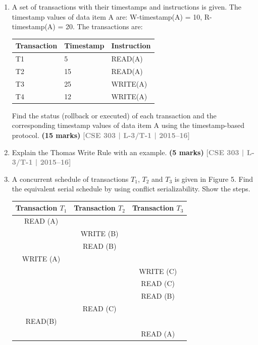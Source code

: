 \documentclass[12pt,a3paper]{article}
\newcommand{\yr}[1]{\hfill\textcolor{gray}{\small\textbf{[#1]}}}
\newcommand{\mk}[1]{\textcolor{orange!70!black}{\small\textbf{(#1 marks)}}}
\begin{document}
\begin{enumerate}
\item A set of transactions with their timestamps and instructions is given. The timestamp values of data item A are: W-timestamp(A) = 10, R-timestamp(A) = 20. The transactions are:

\medskip
\begin{center}
\begin{tabular}{lll}
\toprule
\textbf{Transaction} & \textbf{Timestamp} & \textbf{Instruction}\\
\midrule
T1 & 5 & READ(A)\\
T2 & 15 & READ(A)\\
T3 & 25 & WRITE(A)\\
T4 & 12 & WRITE(A)\\
\bottomrule
\end{tabular}
\end{center}

Find the status (rollback or executed) of each transaction and the corresponding timestamp values of data item A using the timestamp-based protocol.
\mk{15} \yr{CSE 303 | L-3/T-1 | 2015--16}

\item Explain the Thomas Write Rule with an example.
\mk{5} \yr{CSE 303 | L-3/T-1 | 2015--16}

\item A concurrent schedule of transactions $T_1$, $T_2$ and $T_3$ is given in Figure 5. Find the equivalent serial schedule by using conflict serializability. Show the steps.

\begin{center}
  \renewcommand{\arraystretch}{1.4} %
    \begin{tabular}{c|c|c}
        \textbf{Transaction $T_1$} & \textbf{Transaction $T_2$} & \textbf{Transaction $T_3$} \\ \hline
        READ (A) &           &           \\ \hline
                 & WRITE (B) &           \\ \hline
                 & READ (B)  &           \\ \hline
        WRITE (A)&           &           \\ \hline
                 &           & WRITE (C) \\ \hline
                 &           & READ (C)  \\ \hline
                 &           & READ (B)  \\ \hline
                 & READ (C)  &           \\ \hline
        READ(B)  &           &           \\ \hline
                 &           & READ (A)  \\ \hline
    \end{tabular}
    

\end{center}
\end{enumerate}
\end{document}
